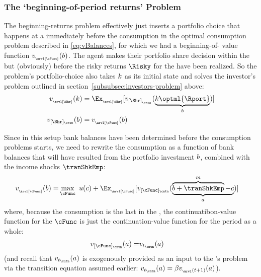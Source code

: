 \documentclass[SolvingMicroDSOPs]{subfiles}
\begin{document}
\hypertarget{beginning-returns}{}
\subsubsection{The `beginning-of-period returns' Problem}\label{subsubsec:beginning-returns}
The beginning-returns problem effectively just inserts a portfolio choice that happens at a {\stg} immediately before the consumption {\stg} in the optimal consumption problem described in \eqref{eq:vBalances}, for which we had a beginning-of-{\stg} value function $\vFunc_{_\arvl[\cFunc]}(\bNrm)$.  The agent makes their portfolio share decision within the {\stg} but (obviously) before the risky returns $\Risky$ for the {\interval} have been realized.  So the problem's portfolio-choice {\stg} also takes $k$ as its initial state and solves the investor's problem outlined in section~\ref{subsubsec:investors-problem} above:
\begin{equation}\begin{gathered}\begin{aligned}
  \vFunc_{_\arvl[\Shr]}(\kNrm) & = \Ex_{_\arvl[\Shr]}[\vFunc_{[\Shr]_{_\cntn}}(\underbrace{\kNrm\optml{\Rport}}_{\bNrm})]
\\ \vFunc_{[\Shr]_\cntn}(\bNrm)  & = \vFunc_{_\arvl[\cFunc]}(\bNrm)
    \end{aligned}\end{gathered}\end{equation}

Since in this setup bank balances have been determined before the consumption problems starts, we need to rewrite the consumption {\stg}  as a function of bank balances that will have resulted from the portfolio investment $b$, combined with the income shocks $\tranShkEmp$:
\begin{equation}\begin{gathered}\begin{aligned}
      \vFunc_{_\arvl[\cFunc]}(\bNrm) = & \max_{\cFunc}~ \uFunc(\cNrm) + \Ex_{_\arvl[\cFunc]}[\vFunc_{[\cFunc]_\cntn}(\underbrace{\overbrace{\bNrm+\tranShkEmp}^{\mNrm}-\cNrm}_{\aNrm})]
    \end{aligned}\end{gathered}\end{equation}
where, because the consumption {\stg} is the last {\stg} in the {\interval}, the continuatibon-value function for the $\cFunc$ {\stg} is just the continuation-value function for the period as a whole:
\begin{equation}\begin{gathered}\begin{aligned}
      \vFunc_{[\cFunc]_\cntn}(\aNrm) = & \vFunc_{\prd_\cntn}(\aNrm)
    \end{aligned}\end{gathered}\end{equation}
(and recall that $\vFunc_{\prd_\cntn}(\aNrm)$ is exogenously provided as an input to the {\interval}'s problem via the transition equation assumed earlier: $\vFunc_{\prd_\cntn}(\aNrm)=\DiscFac \vFunc_{_\arvl(\prd+1)}(a)$).
\end{document}
